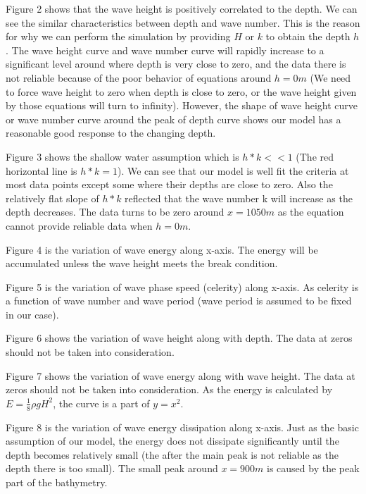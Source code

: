 %
Figure 2 shows that the wave height is positively correlated to the depth. We can see the similar characteristics between depth and wave number. This is the reason for why we can perform the simulation by providing ${H}$ or ${k}$ to obtain the depth ${h}$. The wave height curve and wave number curve will rapidly increase to a significant level around where depth is very close to zero, and the data there is not reliable because of the poor behavior of equations around $h=0 m$ (We need to force wave height to zero when depth is close to zero, or the wave height given by those equations will turn to infinity). However, the shape of wave height curve or wave number curve around the peak of depth curve shows our model has a reasonable good response to the changing depth.

Figure 3 shows the shallow water assumption which is $h*k<<1$ (The red horizontal line is $h*k=1$). We can see that our model is well fit the criteria at most data points except some where their depths are close to zero. Also the relatively flat slope of $h*k$ reflected that the wave number k will increase as the depth decreases. The data turns to be zero around $x = 1050 m$ as the equation cannot provide reliable data when $h = 0 m$.

Figure 4 is the variation of wave energy along x-axis. The energy will be accumulated unless the wave height meets the break condition. 

Figure 5 is the variation of wave phase speed (celerity) along x-axis. As celerity is a function of wave number and wave period (wave period is assumed to be fixed in our case). 

Figure 6 shows the variation of wave height along with depth. The data at zeros should not be taken into consideration.

Figure 7 shows the variation of wave energy along with wave height. The data at zeros should not be taken into consideration. As the energy is calculated by $E=\frac{1}{8}\rho g H^2$, the curve is a part of $y=x^2$.

Figure 8 is the variation of wave energy dissipation along x-axis. Just as the basic assumption of our model, the energy does not dissipate significantly until the depth becomes relatively small (the after the main peak is not reliable as the depth there is too small). The small peak around $x=900 m$ is caused by the peak part of the bathymetry.

